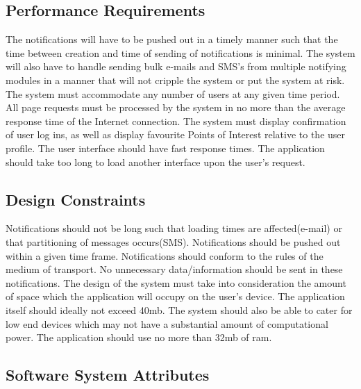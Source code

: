 \documentclass{article}
\begin{document}
\subsection{Performance Requirements}
The notifications will have to be pushed out in a timely manner such that the time between creation and time of sending of notifications is minimal.
\newline
The system will also have to handle sending bulk e-mails and SMS's from multiple notifying modules in a manner that will not cripple the system or put the system at risk.
\newline
The system must accommodate any number of users at any given time period. All page requests must be processed by the system in no more than the average response time of the Internet connection. 
\newline
The system must display confirmation of user log ins, as well as display favourite Points of Interest relative to the user profile.
\newline
The user interface should have fast response times. The application should take too long to load another interface upon the user's request.
\subsection{Design Constraints}

\begin{flushleft}
    Notifications should not be long such that loading times are affected(e-mail) or that partitioning of messages occurs(SMS). Notifications should be pushed out within a given time frame. Notifications should conform to the rules of the medium of transport. No unnecessary data/information should be sent in these notifications. 
\newline
    The design of the system must take into consideration the amount of space which the application will occupy on the user's device. The application itself should ideally not exceed 40mb. The system should also be able to cater for low end devices which may not have a substantial amount of computational power. The application should use no more than 32mb of ram.
    \end{flushleft}

\subsection{Software System Attributes}
\end{document}
